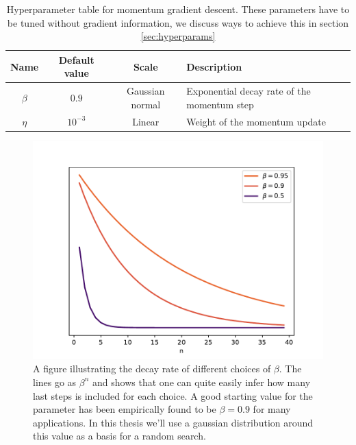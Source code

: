 \begin{table}
\begin{tabular}{c|c|c|l}
Name &Default value & Scale  & Description\\
\hline
$\beta$  & $0.9$ & Gaussian normal & Exponential decay rate of the momentum step\\
$\eta$  & $10^{-3}$ & Linear & Weight of the momentum update
\end{tabular}
\caption{Hyperparameter table for momentum gradient descent. These parameters have to be tuned without gradient information, we discuss ways to achieve this in section \ref{sec:hyperparams}}\label{tab:momentum}
\end{table}


\begin{figure}
\centering
\includegraphics{../figures/beta_decay.pdf}
\caption{A figure illustrating the decay rate of different choices of $\beta$. The lines go as $\beta^n$ and shows that one can quite easily infer how many last steps is included for each choice. A good starting value for the parameter has been empirically found to be $\beta=0.9$ for many applications. In this thesis we'll use a gaussian distribution around this value as a basis for a random search.}\label{fig:beta}
\end{figure}


